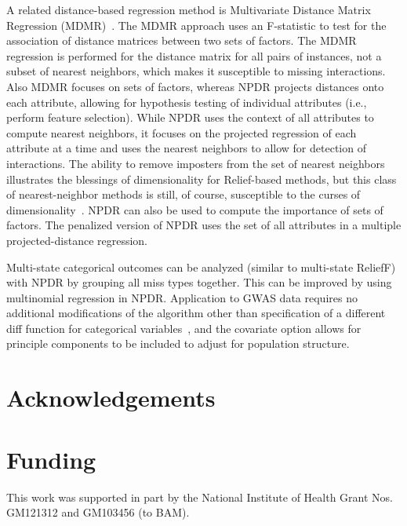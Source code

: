 \documentclass[10pt]{article}
\begin{document}
A related distance-based regression method is Multivariate Distance Matrix Regression (MDMR)~\cite{schork12}. The MDMR approach uses an F-statistic to test for the association of distance matrices between two sets of factors. The MDMR regression is performed for the distance matrix for all pairs of instances, not a subset of nearest neighbors, which makes it susceptible to missing interactions. Also MDMR focuses on sets of factors, whereas NPDR projects distances onto each attribute, allowing for hypothesis testing of individual attributes (i.e., perform feature selection). While NPDR uses the context of all attributes to compute nearest neighbors, it focuses on the projected regression of each attribute at a time and uses the nearest neighbors to allow for detection of interactions. The ability to remove imposters from the set of nearest neighbors illustrates the blessings of dimensionality for Relief-based methods, but this class of nearest-neighbor methods is still, of course, susceptible to the curses of dimensionality~\cite{CoD}. NPDR can also be used to compute the importance of sets of factors. The penalized version of NPDR uses the set of all attributes in a multiple projected-distance regression.

Multi-state categorical outcomes can be analyzed (similar to multi-state ReliefF) with NPDR by grouping all miss types together. This can be improved by using multinomial regression in NPDR. Application to GWAS data requires no additional modifications of the algorithm other than specification of a different diff function for categorical variables~\cite{titv}, and the covariate option allows for principle components to be included to adjust for population structure. 

\section*{Acknowledgements}

\section*{Funding}
This work was supported in part by the National Institute of Health Grant Nos. GM121312 and GM103456 (to BAM). 


%

\end{document}
